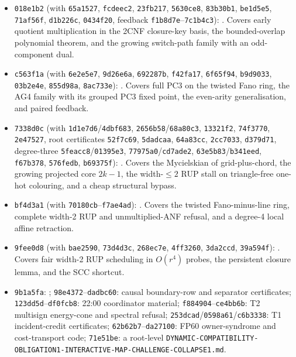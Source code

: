 \documentclass[11pt]{article}
\theoremstyle{definition}
\theoremstyle{remark}
\begin{document}
\begin{itemize}
\item \texttt{018e1b2} (with \texttt{65a1527}, \texttt{fcdeec2}, \texttt{23fb217},
\texttt{5630ce8}, \texttt{83b30b1}, \texttt{be1d5e5}, \texttt{71af56f}, \texttt{d1b226c},
\texttt{0434f20}, feedback \texttt{f1b8d7e}--\texttt{7c1b4c3}):
.
Covers early quotient multiplication in the 2CNF closure-key basis, the bounded-overlap
polynomial theorem, and the growing switch-path family with an odd-component dual.
\item \texttt{c563f1a} (with \texttt{6e2e5e7}, \texttt{9d26e6a}, \texttt{692287b},
\texttt{f42fa17}, \texttt{6f65f94}, \texttt{b9d9033}, \texttt{03b2e4e}, \texttt{855d98a},
\texttt{8ac733e}):
.
Covers full PC3 on the twisted Fano ring, the AG4 family with its grouped PC3 fixed point,
the even-arity generalisation, and paired feedback.
\item \texttt{7338d0c} (with \texttt{1d1e7d6}/\texttt{4dbf683}, \texttt{2656b58}/\texttt{68a80c3},
\texttt{13321f2}, \texttt{74f3770}, \texttt{2e47527}, root certificates \texttt{52f7c69},
\texttt{5dadcaa}, \texttt{64a83cc}, \texttt{2cc7033}, \texttt{d379d71}, degree-three
\texttt{5feacc8}/\texttt{01395e3}, \texttt{77975a0}/\texttt{cd7ade2},
\texttt{63e5b83}/\texttt{b341eed}, \texttt{f67b378}, \texttt{576fedb}, \texttt{b69375f}):
.
Covers the Mycielskian of grid-plus-chord, the growing projected core $2k-1$, the width-$\le2$
RUP stall on triangle-free one-hot colouring, and a cheap structural bypass.
\item \texttt{bf4d3a1} (with \texttt{70180cb}--\texttt{f7ae4ad}):
.
Covers the twisted Fano-minus-line ring, complete width-2 RUP and unmultiplied-ANF refusal,
and a degree-4 local affine retraction.
\item \texttt{9fee0d8} (with \texttt{bae2590}, \texttt{73d4d3c}, \texttt{268ec7e},
\texttt{4ff3260}, \texttt{3da2ccd}, \texttt{39a594f}):
. Covers fair
width-2 RUP scheduling in $O(r^4)$ probes, the persistent closure lemma, and the SCC shortcut.
\item \texttt{9b1a5fa}: ;
\texttt{98e4372}--\texttt{dadbc60}: causal boundary-row and separator certificates;
\texttt{123dd5d}--\texttt{df0fcb8}: 22:00 coordinator material; \texttt{f884904}--\texttt{ce4bb6b}:
T2 multisign energy-cone and spectral refusal; \texttt{253dcad}/\texttt{0598a61}/\texttt{c6b3338}:
T1 incident-credit certificates; \texttt{62b62b7}--\texttt{da27100}: FP60 owner-syndrome and
cost-transport code; \texttt{71e51be}: a root-level
\texttt{DYNAMIC-COMPATIBILITY-OBLIGATION1-\allowbreak INTERACTIVE-MAP-CHALLENGE-COLLAPSE1.md}.
\end{itemize}
\end{document}
